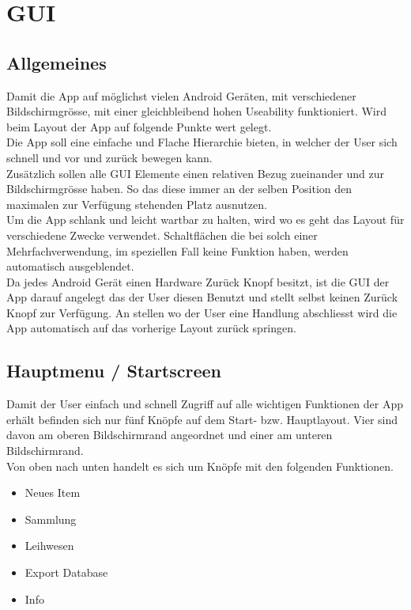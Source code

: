 \section{GUI}

\subsection{Allgemeines}

Damit die App auf möglichst vielen Android Geräten, mit verschiedener Bildschirmgrösse, mit einer gleichbleibend hohen Useability funktioniert. Wird beim Layout der App auf folgende Punkte wert gelegt.\\

Die App soll eine einfache und Flache Hierarchie bieten, in welcher der User sich schnell und vor und zurück bewegen kann.\\
Zusätzlich sollen alle GUI Elemente einen relativen Bezug zueinander und zur Bildschirmgrösse haben. So das diese immer an der selben Position den maximalen zur Verfügung stehenden Platz ausnutzen.\\
Um die App schlank und leicht wartbar zu halten, wird wo es geht das Layout für verschiedene Zwecke verwendet. Schaltflächen die bei solch einer Mehrfachverwendung, im speziellen Fall keine Funktion haben, werden automatisch ausgeblendet.\\
Da jedes Android Gerät einen Hardware Zurück Knopf besitzt, ist die GUI der App darauf angelegt das der User diesen Benutzt und stellt selbst keinen Zurück Knopf zur Verfügung. An stellen wo der User eine Handlung abschliesst wird die App automatisch auf das vorherige Layout zurück springen.

\subsection{Hauptmenu / Startscreen}

Damit der User einfach und schnell Zugriff auf alle wichtigen Funktionen der App erhält befinden sich nur fünf Knöpfe auf dem Start- bzw. Hauptlayout. Vier sind davon am oberen Bildschirmrand angeordnet und einer am unteren Bildschirmrand.\\

Von oben nach unten handelt es sich um Knöpfe mit den folgenden Funktionen.

\begin{itemize}
	\item Neues Item
	\item Sammlung
	\item Leihwesen
	\item Export Database
	\item Info
\end{itemize} 

